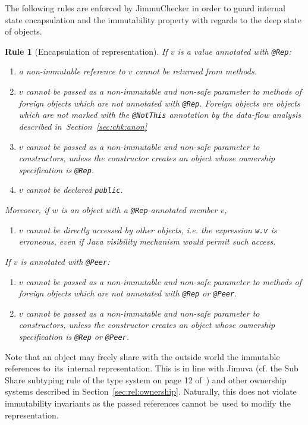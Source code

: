 \documentclass{pracamgr}
\theoremstyle{break}
\theoremstyle{break}
\theoremstyle{break}
\newtheorem{verrule}{Rule}
\begin{document}
The following rules are enforced by JimmuChecker in order to guard
internal state encapsulation and the immutability property with
regards to the deep state of objects.

\begin{verrule}[Encapsulation of representation]
  If $v$ is a value annotated with \texttt{@Rep}:
  \begin{enumerate}[label=(\arabic*)]
  \item a non-immutable reference to $v$ cannot be returned from
    methods.
  \item $v$ cannot be passed as a non-immutable and non-safe parameter
    to methods of fo\-reign objects which are not annotated with
    \texttt{@Rep}. Foreign objects are objects which are not marked
    with the \texttt{@NotThis} annotation by the data-flow analysis
    described in~Section~\ref{sec:chk:anon}
  \item $v$ cannot be passed as a non-immutable and non-safe parameter
    to constructors, unless the constructor creates an object whose
    ownership specification is \texttt{@Rep}.
  \item $v$ cannot be declared \texttt{public}. 
  \end{enumerate}
  Moreover, if $w$ is an object with a \texttt{@Rep}-annotated member
  $v$,
  \begin{enumerate}[label=(\arabic*), resume]
  \item $v$ cannot be directly accessed by other objects, i.e. the
    expression \texttt{w.v} is erroneous, even if Java visibility
    mechanism would permit such access.
  \end{enumerate}
  If $v$ is annotated with \texttt{@Peer}:
  \begin{enumerate}[label=(\arabic*), resume]
  \item $v$ cannot be passed as a non-immutable and non-safe parameter
    to methods of foreign objects which are not annotated with
    \texttt{@Rep} or \texttt{@Peer}.
  \item $v$ cannot be passed as a non-immutable and non-safe parameter
    to constructors, unless the constructor creates an object whose
    ownership specification is \texttt{@Rep} or \texttt{@Peer}.
  \end{enumerate}
\end{verrule}

Note that an object may freely share with the outside world the
immutable references to~its~internal representation. This is in line
with Jimuva (cf. the Sub Share subtyping rule of the type system on
page 12 of~\cite{haack}) and other ownership systems described in
Section~\ref{sec:rel:ownership}. Naturally, this does not violate
immutability invariants as the passed references cannot be~used to
modify the representation. 
\end{document}
